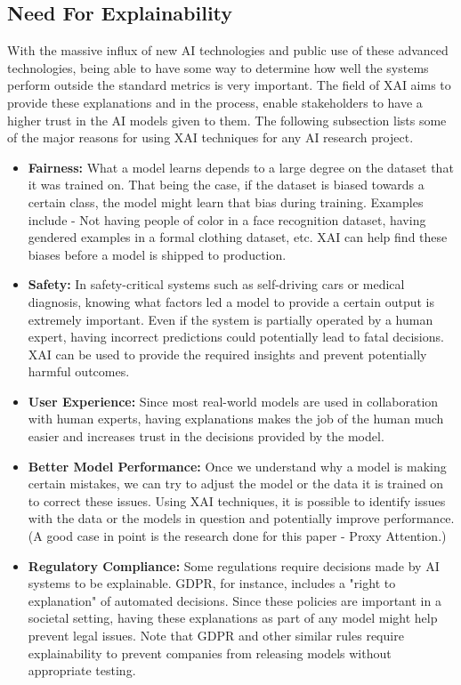 \subsection{Need For Explainability}
With the massive influx of new AI technologies and public use of these advanced technologies, being able to have some way to determine how well the systems perform outside the standard metrics is very important. The field of XAI aims to provide these explanations and in the process, enable stakeholders to have a higher trust in the AI models given to them. The following subsection lists some of the major reasons for using XAI techniques for any AI research project.
\begin{itemize}
    \item \textbf{Fairness: } What a model learns depends to a large degree on the dataset that it was trained on. That being the case, if the dataset is biased towards a certain class, the model might learn that bias during training. Examples include - Not having people of color in a face recognition dataset, having gendered examples in a formal clothing dataset, etc. XAI can help find these biases before a model is shipped to production.
    \item \textbf{Safety: } In safety-critical systems such as self-driving cars or medical diagnosis, knowing what factors led a model to provide a certain output is extremely important. Even if the system is partially operated by a human expert, having incorrect predictions could potentially lead to fatal decisions. XAI can be used to provide the required insights and prevent potentially harmful outcomes.
    \item \textbf{User Experience: } Since most real-world models are used in collaboration with human experts, having explanations makes the job of the human much easier and increases trust in the decisions provided by the model.
    \item \textbf{Better Model Performance: } Once we understand why a model is making certain mistakes, we can try to adjust the model or the data it is trained on to correct these issues. Using XAI techniques, it is possible to identify issues with the data or the models in question and potentially improve performance. (A good case in point is the research done for this paper - Proxy Attention.)
    \item \textbf{Regulatory Compliance: } Some regulations require decisions made by AI systems to be explainable. GDPR, for instance, includes a "right to explanation" of automated decisions. Since these policies are important in a societal setting, having these explanations as part of any model might help prevent legal issues. Note that GDPR and other similar rules require explainability to prevent companies from releasing models without appropriate testing.
    \end{itemize}

